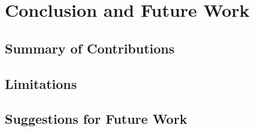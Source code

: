 \clearpage

\chapter{Conclusion and Future Work}

\section{Summary of Contributions}
\section{Limitations}
\section{Suggestions for Future Work}

\newpage
